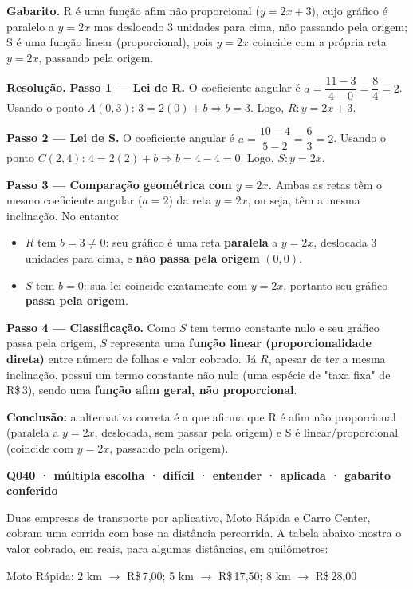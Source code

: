 \documentclass[11pt,a4paper]{article}
\begin{document}
\textbf{Gabarito.} R é uma função afim não proporcional ($y=2x+3$), cujo gráfico é paralelo a $y=2x$ mas deslocado 3 unidades para cima, não passando pela origem; S é uma função linear (proporcional), pois $y=2x$ coincide com a própria reta $y=2x$, passando pela origem.

\textbf{Resolução.} \textbf{Passo 1 — Lei de R.}
O coeficiente angular é $a = \dfrac{11-3}{4-0} = \dfrac{8}{4} = 2$.
Usando o ponto $A(0,3)$: $3 = 2(0) + b \Rightarrow b = 3$.
Logo, $R: y = 2x + 3$.

\textbf{Passo 2 — Lei de S.}
O coeficiente angular é $a = \dfrac{10-4}{5-2} = \dfrac{6}{3} = 2$.
Usando o ponto $C(2,4)$: $4 = 2(2) + b \Rightarrow b = 4 - 4 = 0$.
Logo, $S: y = 2x$.

\textbf{Passo 3 — Comparação geométrica com $y=2x$.}
Ambas as retas têm o mesmo coeficiente angular ($a=2$) da reta $y=2x$, ou seja, têm a mesma inclinação. No entanto:
\begin{itemize}[nosep,leftmargin=*]
\item $R$ tem $b=3 \neq 0$: seu gráfico é uma reta \textbf{paralela} a $y=2x$, deslocada 3 unidades para cima, e \textbf{não passa pela origem} $(0,0)$.
\item $S$ tem $b=0$: sua lei coincide exatamente com $y=2x$, portanto seu gráfico \textbf{passa pela origem}.
\end{itemize}

\textbf{Passo 4 — Classificação.}
Como $S$ tem termo constante nulo e seu gráfico passa pela origem, $S$ representa uma \textbf{função linear (proporcionalidade direta)} entre número de folhas e valor cobrado. Já $R$, apesar de ter a mesma inclinação, possui um termo constante não nulo (uma espécie de "taxa fixa" de R\$\,3), sendo uma \textbf{função afim geral, não proporcional}.

\textbf{Conclusão:} a alternativa correta é a que afirma que R é afim não proporcional (paralela a $y=2x$, deslocada, sem passar pela origem) e S é linear/proporcional (coincide com $y=2x$, passando pela origem).

\bigskip\noindent\textbf{Q040 · múltipla escolha · difícil · entender · aplicada · gabarito conferido}\par\nopagebreak
Duas empresas de transporte por aplicativo, Moto Rápida e Carro Center, cobram uma corrida com base na distância percorrida. A tabela abaixo mostra o valor cobrado, em reais, para algumas distâncias, em quilômetros:

Moto Rápida: 2 km $\to$ R\$\,7,00; 5 km $\to$ R\$\,17,50; 8 km $\to$ R\$\,28,00
\end{document}
